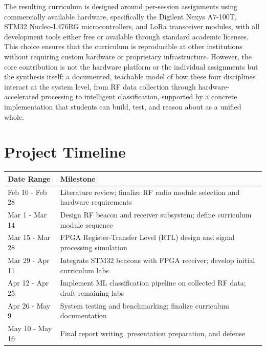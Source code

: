 \documentclass[10pt]{article}
\begin{document}
	The resulting curriculum is designed around per-session assignments using commercially available hardware, specifically the Digilent Nexys A7-100T, STM32 Nucleo-L476RG microcontrollers, and LoRa transceiver modules, with all development tools either free or available through standard academic licenses. This choice ensures that the curriculum is reproducible at other institutions without requiring custom hardware or proprietary infrastructure. However, the core contribution is not the hardware platform or the individual assignments but the synthesis itself: a documented, teachable model of how these four disciplines interact at the system level, from RF data collection through hardware-accelerated processing to intelligent classification, supported by a concrete implementation that students can build, test, and reason about as a unified whole.
	
	\section{Project Timeline}
	
	\begin{tabular}{|l|l|}
		\hline
		\textbf{Date Range} & \textbf{Milestone} \\
		\hline
		Feb 10 - Feb 28 & Literature review; finalize RF radio module selection and hardware requirements \\
		\hline
		Mar 1 - Mar 14 & Design RF beacon and receiver subsystem; define curriculum module sequence \\
		\hline
		Mar 15 - Mar 28 & FPGA Register-Transfer Level (RTL) design and signal processing simulation \\
		\hline
		Mar 29 - Apr 11 & Integrate STM32 beacons with FPGA receiver; develop initial curriculum labs \\
		\hline
		Apr 12 - Apr 25 & Implement ML classification pipeline on collected RF data; draft remaining labs \\
		\hline
		Apr 26 - May 9 & System testing and benchmarking; finalize curriculum documentation \\
		\hline
		May 10 - May 16 & Final report writing, presentation preparation, and defense \\
		\hline
	\end{tabular}
	
\end{document}
